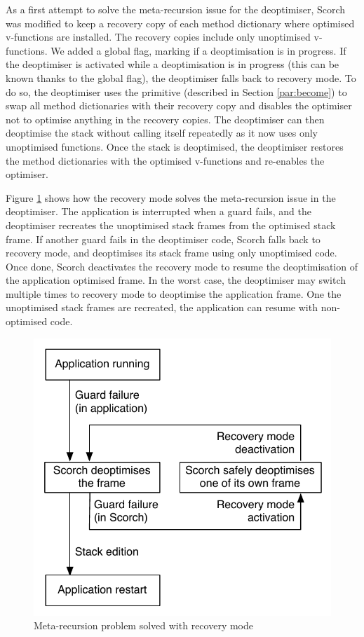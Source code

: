 \documentclass[a4paper,12pt,twoside]{../includes/ThesisStyle}
\begin{document}
As a first attempt to solve the meta-recursion issue for the deoptimiser, Scorch was modified to keep a recovery copy of each method dictionary where optimised v-functions are installed. The recovery copies include only unoptimised v-functions. We added a global flag, marking if a deoptimisation is in progress. If the deoptimiser is activated while a deoptimisation is in progress (this can be known thanks to the global flag), the deoptimiser falls back to recovery mode. To do so, the deoptimiser uses the primitive  (described in Section \ref{par:become}) to swap all method dictionaries with their recovery copy and disables the optimiser not to optimise anything in the recovery copies. The deoptimiser can then deoptimise the stack without calling itself repeatedly as it now uses only unoptimised functions. Once the stack is deoptimised, the deoptimiser restores the method dictionaries with the optimised v-functions and re-enables the optimiser. 

Figure \ref{fig:InfiniteRecursionDeoptPbRecovery} shows how the recovery mode solves the meta-recursion issue in the deoptimiser. The application is interrupted when a guard fails, and the deoptimiser recreates the unoptimised stack frames from the optimised stack frame. If another guard fails in the deoptimiser code, Scorch falls back to recovery mode, and deoptimises its stack frame using only unoptimised code. Once done, Scorch deactivates the recovery mode to resume the deoptimisation of the application optimised frame. In the worst case, the deoptimiser may switch multiple times to recovery mode to deoptimise the application frame. One the unoptimised stack frames are recreated, the application can resume with non-optimised code.

\begin{figure}[h!]
    \begin{center}
        \includegraphics[width=0.6\linewidth]{InfiniteRecursionDeoptPbRecovery}
        \caption{Meta-recursion problem solved with recovery mode}
        \label{fig:InfiniteRecursionDeoptPbRecovery}
    \end{center}
\end{figure}
\end{document}
